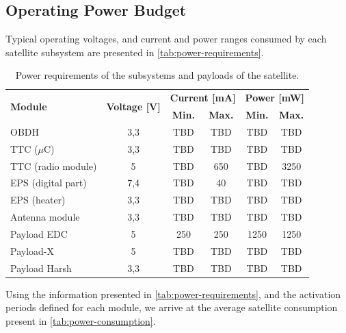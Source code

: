 \subsection{Operating Power Budget}

Typical operating voltages, and current and power ranges consumed by each satellite subsystem are presented in \autoref{tab:power-requirements}.

\begin{table}[!h]
    \centering
    \begin{tabular}{lccccc}
        \toprule[1.5pt]
        \multirow{2}{*}{\textbf{Module}} & \multirow{2}{*}{\textbf{Voltage [V]}}    & \multicolumn{2}{c}{\textbf{Current [mA]}} & \multicolumn{2}{c}{\textbf{Power [mW]}} \\
                                         &                                          & \textbf{Min.} & \textbf{Max.}             & \textbf{Min.} & \textbf{Max.} \\
        \midrule
        OBDH                & 3,3   & TBD   & TBD   & TBD   & TBD \\
        TTC ($\mu$C)        & 3,3   & TBD   & TBD   & TBD   & TBD \\
        TTC (radio module)  & 5     & TBD   & 650   & TBD   & 3250 \\
        EPS (digital part)  & 7,4   & TBD   & 40    & TBD   & TBD \\
        EPS (heater)        & 3,3   & TBD   & TBD   & TBD   & TBD \\
        Antenna module      & 3,3   & TBD   & TBD   & TBD   & TBD \\
        Payload EDC         & 5     & 250   & 250   & 1250  & 1250 \\
        Payload-X           & 5     & TBD   & TBD   & TBD   & TBD \\
        Payload Harsh       & 3,3   & TBD   & TBD   & TBD   & TBD \\
        \bottomrule[1.5pt]
    \end{tabular}
    \caption{Power requirements of the subsystems and payloads of the satellite.}
    \label{tab:power-requirements}
\end{table}

Using the information presented in \autoref{tab:power-requirements}, and the activation periods defined for each module, we arrive at the average satellite consumption present in \autoref{tab:power-consumption}.

